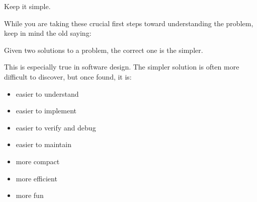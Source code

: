 \begin{tip}
Keep it simple.
\end{tip}

\noindent While you are taking these crucial first steps toward
understanding the problem, keep in mind the old saying:

\begin{tfquot}
Given two solutions to a problem, the correct one is the simpler.
\end{tfquot}
This is especially true in software design. The simpler solution is often
more difficult to discover, but once found, it is:

\begin{itemize}
\item easier to understand
\item easier to implement
\item easier to verify and debug
\item easier to maintain
\item more compact
\item more efficient
\item more fun
\end{itemize}

